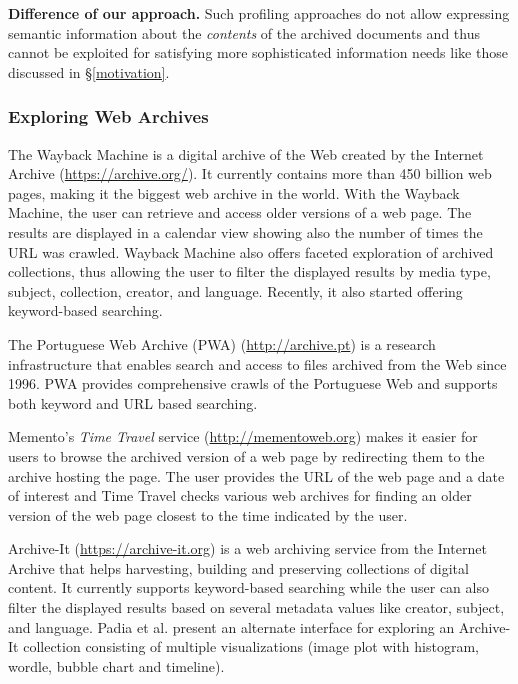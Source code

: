 \documentclass{libtex/sig-alternate-05-2015}
\begin{document}
\vspace{0.9mm} \noindent
{\bf Difference of our approach.}
Such profiling approaches do not allow expressing semantic information about the
{\em contents} of the archived documents and thus cannot be exploited for satisfying more sophisticated
information needs like those discussed in \S \ref{motivation}.


\subsubsection{Exploring Web Archives}

The Wayback Machine is a digital archive
of the Web
created by the Internet Archive (\url{https://archive.org/}).
It currently contains more than
450 billion web pages, making it the biggest web archive in the world.
With the Wayback Machine, the user can retrieve and access older versions of a web page.
The results are displayed in a calendar view
showing also the number of times the URL was crawled.
Wayback Machine also offers faceted exploration of archived collections,
thus allowing the user to filter the displayed results by media type, subject,
collection, creator, and language.
Recently, it also started offering keyword-based searching. %

The Portuguese Web Archive (PWA) (\url{http://archive.pt})
is a research infrastructure that enables search and access to files archived from the Web since 1996.
PWA provides comprehensive crawls of the Portuguese Web
and supports both keyword and URL based searching.

Memento's {\em Time Travel} service (\url{http://mementoweb.org})
makes it easier for users
to browse the archived version of a web page
by redirecting them to the archive hosting the page.
The user provides the URL of the web page and a date of interest
and Time Travel checks various web archives for finding
an older version of the web page closest to the time indicated by the user.

Archive-It (\url{https://archive-it.org}) is a
web archiving service from the Internet Archive that helps
harvesting, building and preserving collections of digital content.
It currently supports keyword-based searching
while the user can also filter the displayed results based on several
metadata values like creator, subject, and language.
Padia et al.\cite{padia2012visualizing} present an alternate interface for
exploring an Archive-It collection
consisting of multiple visualizations (image plot with histogram, wordle,
bubble chart and timeline).
\end{document}
